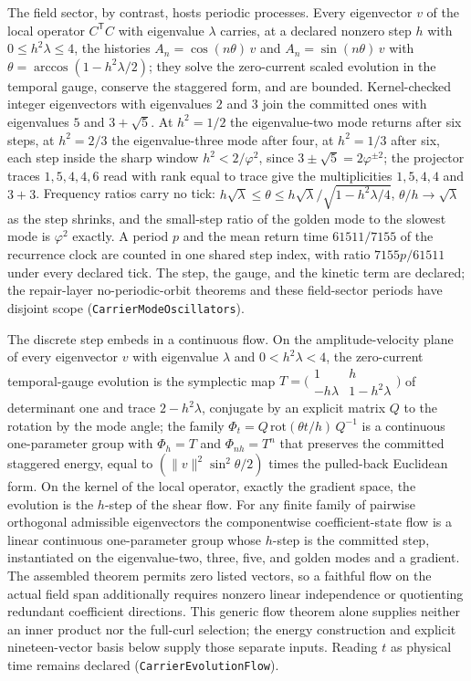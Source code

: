 \documentclass[11pt]{article}
\begin{document}
The field sector, by contrast, hosts periodic processes. Every eigenvector
\(v\) of the local operator \(C^{\mathsf T}C\) with eigenvalue \(\lambda\)
carries, at a declared nonzero step \(h\) with
\(0\le h^2\lambda\le 4\), the histories
\(A_n=\cos(n\theta)\,v\) and \(A_n=\sin(n\theta)\,v\) with
\(\theta=\arccos(1-h^2\lambda/2)\); they solve the zero-current scaled
evolution in the temporal gauge, conserve the staggered form, and are
bounded. Kernel-checked integer eigenvectors with eigenvalues \(2\) and
\(3\) join the committed ones with eigenvalues \(5\) and \(3+\sqrt5\). At
\(h^2=1/2\) the eigenvalue-two mode returns after six steps, at
\(h^2=2/3\) the eigenvalue-three mode after four, at \(h^2=1/3\) after
six, each step inside the sharp window \(h^2<2/\varphi^2\), since
\(3\pm\sqrt5=2\varphi^{\pm2}\); the projector traces \(1,5,4,4,6\) read
with rank equal to trace give the multiplicities \(1,5,4,4\) and \(3+3\).
Frequency ratios carry no tick: \(h\sqrt\lambda\le\theta\le
h\sqrt\lambda/\sqrt{1-h^2\lambda/4}\), \(\theta/h\to\sqrt\lambda\) as the
step shrinks, and the small-step ratio of the golden mode to the slowest
mode is \(\varphi^2\) exactly. A period \(p\) and the mean return time
\(61511/7155\) of the recurrence clock are counted in one shared step
index, with ratio \(7155p/61511\) under every declared tick. The step, the
gauge, and the kinetic term are declared; the repair-layer no-periodic-orbit
theorems and these field-sector periods have disjoint scope
(\texttt{CarrierModeOscillators}).

The discrete step embeds in a continuous flow. On the amplitude-velocity
plane of every eigenvector \(v\) with eigenvalue \(\lambda\) and
\(0<h^2\lambda<4\), the zero-current temporal-gauge evolution is the
symplectic map \(T=\bigl(\begin{smallmatrix}1&h\\-h\lambda&1-h^2\lambda\end{smallmatrix}\bigr)\)
of determinant one and trace \(2-h^2\lambda\), conjugate by an explicit
matrix \(Q\) to the rotation by the mode angle; the family
\(\Phi_t=Q\,\mathrm{rot}(\theta t/h)\,Q^{-1}\) is a continuous one-parameter
group with \(\Phi_h=T\) and \(\Phi_{nh}=T^n\) that preserves the committed
staggered energy, equal to \((\lVert v\rVert^2\sin^2\theta/2)\) times the
pulled-back Euclidean form. On the kernel of the local operator, exactly the
gradient space, the evolution is the \(h\)-step of the shear flow. For any
finite family of pairwise orthogonal admissible eigenvectors the
componentwise coefficient-state flow is a linear continuous one-parameter group whose
\(h\)-step is the committed step, instantiated on the eigenvalue-two,
three, five, and golden modes and a gradient. The assembled theorem permits
zero listed vectors, so a faithful flow on the actual field span additionally
requires nonzero linear independence or quotienting redundant coefficient
directions. This generic flow theorem alone supplies neither an inner product
nor the full-curl selection; the energy construction and explicit
nineteen-vector basis below supply those separate inputs. Reading \(t\) as
physical time remains declared
(\texttt{CarrierEvolutionFlow}).
\end{document}
